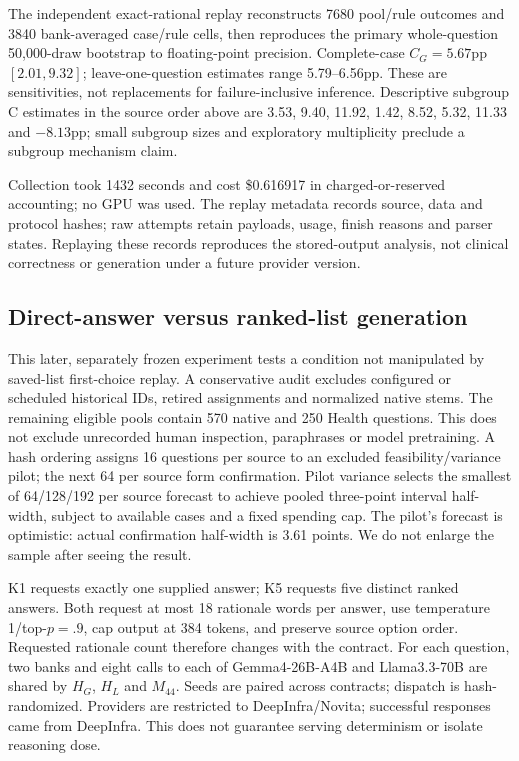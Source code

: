 The independent exact-rational replay reconstructs 7680 pool/rule outcomes and 3840 bank-averaged case/rule cells, then reproduces the primary whole-question 50,000-draw bootstrap to floating-point precision. Complete-case $C_G=5.67$pp $[2.01,9.32]$; leave-one-question estimates range 5.79--6.56pp. These are sensitivities, not replacements for failure-inclusive inference. Descriptive subgroup C estimates in the source order above are 3.53, 9.40, 11.92, 1.42, 8.52, 5.32, 11.33 and $-8.13$pp; small subgroup sizes and exploratory multiplicity preclude a subgroup mechanism claim.

Collection took 1432 seconds and cost \$0.616917 in charged-or-reserved accounting; no GPU was used. The replay metadata records source, data and protocol hashes; raw attempts retain payloads, usage, finish reasons and parser states. Replaying these records reproduces the stored-output analysis, not clinical correctness or generation under a future provider version.

\subsection{Direct-answer versus ranked-list generation}\label{app:contract}

This later, separately frozen experiment tests a condition not manipulated by saved-list first-choice replay. A conservative audit excludes configured or scheduled historical IDs, retired assignments and normalized native stems. The remaining eligible pools contain 570 native and 250 Health questions. This does not exclude unrecorded human inspection, paraphrases or model pretraining. A hash ordering assigns 16 questions per source to an excluded feasibility/variance pilot; the next 64 per source form confirmation. Pilot variance selects the smallest of 64/128/192 per source forecast to achieve pooled three-point interval half-width, subject to available cases and a fixed spending cap. The pilot's forecast is optimistic: actual confirmation half-width is 3.61 points. We do not enlarge the sample after seeing the result.

K1 requests exactly one supplied answer; K5 requests five distinct ranked answers. Both request at most 18 rationale words per answer, use temperature 1/top-$p=.9$, cap output at 384 tokens, and preserve source option order. Requested rationale count therefore changes with the contract. For each question, two banks and eight calls to each of Gemma4-26B-A4B and Llama3.3-70B are shared by $H_G$, $H_L$ and $M_{44}$. Seeds are paired across contracts; dispatch is hash-randomized. Providers are restricted to DeepInfra/Novita; successful responses came from DeepInfra. This does not guarantee serving determinism or isolate reasoning dose.

